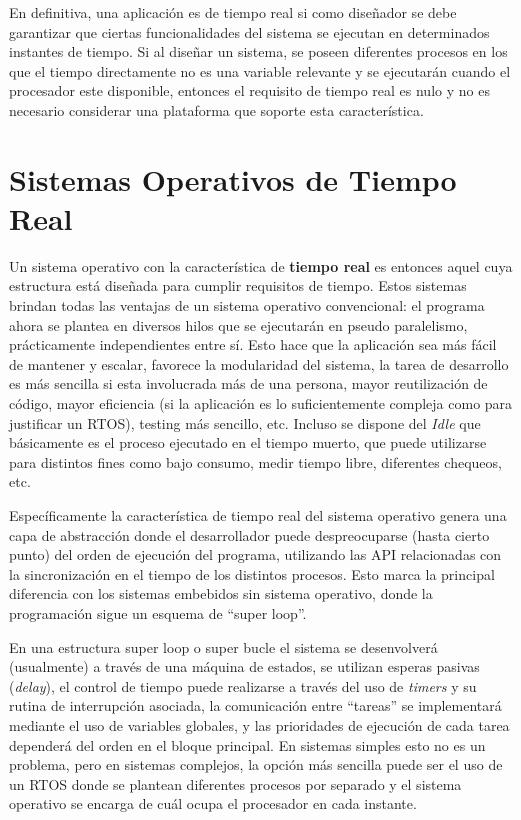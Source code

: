 \documentclass{IEEEtran}
\begin{document}
En definitiva, una aplicación es de tiempo real si como diseñador se debe garantizar que ciertas funcionalidades del sistema se ejecutan en determinados instantes de tiempo. Si al diseñar un sistema, se poseen diferentes procesos en los que el tiempo directamente no es una variable relevante y se ejecutarán cuando el procesador este disponible, entonces el requisito de tiempo real es nulo y no es necesario considerar una plataforma que soporte esta característica. 

\section{Sistemas Operativos de Tiempo Real}
Un sistema operativo con la característica de \textbf{tiempo real} es entonces aquel cuya estructura está diseñada para cumplir requisitos de tiempo. Estos sistemas brindan todas las ventajas de un sistema operativo convencional: el programa ahora se plantea en diversos hilos que se ejecutarán en pseudo paralelismo, prácticamente independientes entre sí. Esto hace que la aplicación sea más fácil de mantener y escalar, favorece la modularidad del sistema, la tarea de desarrollo es más sencilla si esta involucrada más de una persona, mayor reutilización de código, mayor eficiencia (si la aplicación es lo suficientemente compleja como para justificar un RTOS), testing más sencillo, etc. Incluso se dispone del \textit{Idle} que básicamente es el proceso ejecutado en el tiempo muerto, que puede utilizarse para distintos fines como bajo consumo, medir tiempo libre, diferentes chequeos, etc.

Específicamente la característica de tiempo real del sistema operativo genera una capa de abstracción donde el desarrollador puede despreocuparse (hasta cierto punto) del orden de ejecución del programa, utilizando las API relacionadas con la sincronización en el tiempo de los distintos procesos. Esto marca la principal diferencia con los sistemas embebidos sin sistema operativo, donde la programación sigue un esquema de ``super loop''.

En una estructura super loop o super bucle el sistema se desenvolverá (usualmente) a través de una máquina de estados, se utilizan esperas pasivas (\textit{delay}), el control de tiempo puede realizarse a través del uso de \textit{timers} y su rutina de interrupción asociada, la comunicación entre ``tareas'' se implementará mediante el uso de variables globales, y las prioridades de ejecución de cada tarea dependerá del orden en el bloque principal.
En sistemas simples esto no es un problema, pero en sistemas complejos, la opción más sencilla puede ser el uso de un RTOS donde se plantean diferentes procesos por separado y el sistema operativo se encarga de cuál ocupa el procesador en cada instante.
\end{document}
